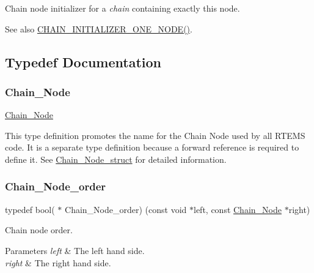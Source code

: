 Chain node initializer for a {\itshape chain} containing exactly this node. 

\begin{DoxySeeAlso}{See also}
\mbox{\hyperlink{group__RTEMSScoreChain_ga7a5473b2ce45742e83c906284e21bd90}{C\+H\+A\+I\+N\+\_\+\+I\+N\+I\+T\+I\+A\+L\+I\+Z\+E\+R\+\_\+\+O\+N\+E\+\_\+\+N\+O\+D\+E()}}. 
\end{DoxySeeAlso}


\subsection{Typedef Documentation}
\mbox{\label{group__RTEMSScoreChain_ga0dd4bfcca1ac7f90de2842e447846d3d}} 
\subsubsection{\texorpdfstring{Chain\_Node}{Chain\_Node}}
{\footnotesize\ttfamily \mbox{\hyperlink{group__RTEMSScoreChain_ga0dd4bfcca1ac7f90de2842e447846d3d}{Chain\+\_\+\+Node}}}

This type definition promotes the name for the Chain Node used by all R\+T\+E\+MS code. It is a separate type definition because a forward reference is required to define it. See \mbox{\hyperlink{structChain__Node__struct}{Chain\+\_\+\+Node\+\_\+struct}} for detailed information. \mbox{\label{group__RTEMSScoreChain_gae0cd0f9e8aa8b188cc3abed0fc77b9e7}} 
\subsubsection{\texorpdfstring{Chain\_Node\_order}{Chain\_Node\_order}}
{\footnotesize\ttfamily typedef bool( $\ast$ Chain\+\_\+\+Node\+\_\+order) (const void $\ast$left, const \mbox{\hyperlink{group__RTEMSScoreChain_ga0dd4bfcca1ac7f90de2842e447846d3d}{Chain\+\_\+\+Node}} $\ast$right)}



Chain node order. 


\begin{DoxyParams}{Parameters}
{\em left} & The left hand side. \\
\hline
{\em right} & The right hand side.\\
\hline
\end{DoxyParams}

